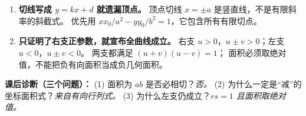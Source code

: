 \begin{trapbox}
\begin{enumerate}
\item \textbf{切线写成 $y=kx+d$ 就遗漏顶点。}
顶点切线 $x=\pm a$ 是竖直线，不是有限斜率的斜截式。
优先用 $xx_0/a^2-yy_0/b^2=1$，它包含所有有限切点。

\item \textbf{只证明了右支正参数，就宣布全曲线成立。}
右支 $u>0$，$u\pm v>0$；左支 $u<0$，$u\pm v<0$。
两支都满足 $(u+v)(u-v)=1$；
面积必须取绝对值，不能把负有向面积当成负几何面积。

\end{enumerate}

\textbf{课后诊断（三个问题）：}
(1) 面积为 $ab$ 是否必相切？\emph{否。}
(2) 为什么一定是``减''的坐标面积式？\emph{来自有向行列式。}
(3) 为什么左支仍成立？\emph{$rs=1$ 且面积取绝对值。}
\end{trapbox}
